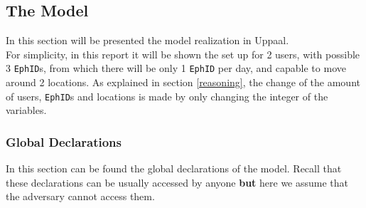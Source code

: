 \documentclass[a4paper, twocolumn]{article}
\begin{document}
\subsection{The Model}
In this section will be presented the model realization in Uppaal.\\
For simplicity, in this report it will be shown the set up for 2 users, with possible 3 \texttt{EphID}s, from which there will be only 1 \texttt{EphID} per day, and capable to move around 2 locations. As explained in section \ref{reasoning}, the change of the amount of users, \texttt{EphID}s and locations is made by only changing the integer of the variables.
\subsubsection{Global Declarations}
In this section can be found the global declarations of the model. Recall that these declarations can be usually accessed by anyone \textbf{but} here we assume that the adversary cannot access them.
\end{document}
